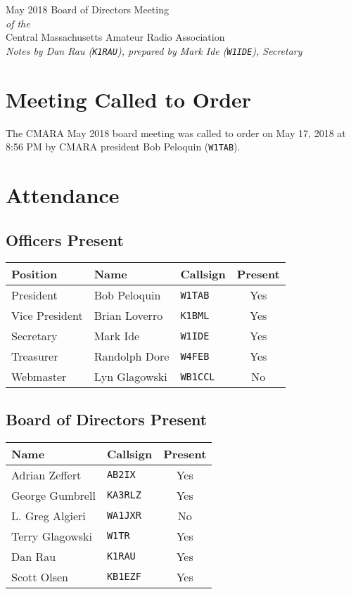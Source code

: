 \documentclass[10pt,letterpaper]{article}
\begin{document}
\begin{center}
{\huge May 2018 Board of Directors Meeting}\\
\emph{of the}\\
{\Large Central Massachusetts Amateur Radio Association}\\
\emph{Notes by Dan Rau (\texttt{K1RAU}), prepared by Mark Ide (\texttt{W1IDE}), Secretary}
\end{center}

\section{Meeting Called to Order}
The CMARA May 2018 board meeting was called to order on May 17, 2018 at 8:56 PM by CMARA president Bob Peloquin (\texttt{W1TAB}).

\section{Attendance}

\subsection{Officers Present}
\begin{tabular}{|l|l|l|c|}
  \hline
  \textbf{Position} & \textbf{Name}  & \textbf{Callsign} & \textbf{Present} \\ \hline
  President         & Bob Peloquin   & \texttt{W1TAB}    & Yes \\
  Vice President    & Brian Loverro  & \texttt{K1BML}    & Yes \\
  Secretary         & Mark Ide       & \texttt{W1IDE}    & Yes \\
  Treasurer         & Randolph Dore  & \texttt{W4FEB}    & Yes \\
  Webmaster         & Lyn Glagowski  & \texttt{WB1CCL}   & No  \\
  \hline
\end{tabular}

\subsection{Board of Directors Present}
\begin{tabular}{|l|l|c|}
  \hline
  \textbf{Name}   & \textbf{Callsign} & \textbf{Present} \\ \hline
  Adrian Zeffert  & \texttt{AB2IX}    &  Yes \\ \hline
  George Gumbrell & \texttt{KA3RLZ}   &  Yes \\ \hline
  L. Greg Algieri & \texttt{WA1JXR}   &  No  \\ \hline
  Terry Glagowski & \texttt{W1TR}     &  Yes \\ \hline
  Dan Rau         & \texttt{K1RAU}    &  Yes \\ \hline
  Scott Olsen     & \texttt{KB1EZF}   &  Yes \\ \hline
\end{tabular}\\
\end{document}
